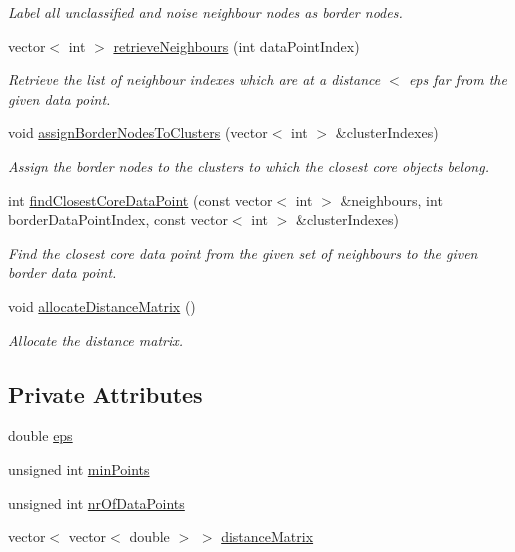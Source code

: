 \begin{DoxyCompactItemize}
\begin{DoxyCompactList}\small\item\em Label all unclassified and noise neighbour nodes as border nodes. \end{DoxyCompactList}\item 
vector$<$ int $>$ \hyperlink{classmultiscale_1_1analysis_1_1DBSCAN_a2524149cf55398e2038aaa389b56bfec}{retrieve\-Neighbours} (int data\-Point\-Index)
\begin{DoxyCompactList}\small\item\em Retrieve the list of neighbour indexes which are at a distance $<$ eps far from the given data point. \end{DoxyCompactList}\item 
void \hyperlink{classmultiscale_1_1analysis_1_1DBSCAN_a1c55a2e893f28de4a68129407c55d5f3}{assign\-Border\-Nodes\-To\-Clusters} (vector$<$ int $>$ \&cluster\-Indexes)
\begin{DoxyCompactList}\small\item\em Assign the border nodes to the clusters to which the closest core objects belong. \end{DoxyCompactList}\item 
int \hyperlink{classmultiscale_1_1analysis_1_1DBSCAN_a7a1c95e78edf9e804a7809648e130bda}{find\-Closest\-Core\-Data\-Point} (const vector$<$ int $>$ \&neighbours, int border\-Data\-Point\-Index, const vector$<$ int $>$ \&cluster\-Indexes)
\begin{DoxyCompactList}\small\item\em Find the closest core data point from the given set of neighbours to the given border data point. \end{DoxyCompactList}\item 
void \hyperlink{classmultiscale_1_1analysis_1_1DBSCAN_af50079a4d370fb35b13b0a1557a454f0}{allocate\-Distance\-Matrix} ()
\begin{DoxyCompactList}\small\item\em Allocate the distance matrix. \end{DoxyCompactList}\end{DoxyCompactItemize}
\subsection*{Private Attributes}
\begin{DoxyCompactItemize}
\item 
double \hyperlink{classmultiscale_1_1analysis_1_1DBSCAN_a8d68cd84561cbb06bd138f8edf340b9f}{eps}
\item 
unsigned int \hyperlink{classmultiscale_1_1analysis_1_1DBSCAN_a7bafd4070ac44e236fcc7f06d92b6572}{min\-Points}
\item 
unsigned int \hyperlink{classmultiscale_1_1analysis_1_1DBSCAN_af81a42ca24493494b3d20e27c76be016}{nr\-Of\-Data\-Points}
\item 
vector$<$ vector$<$ double $>$ $>$ \hyperlink{classmultiscale_1_1analysis_1_1DBSCAN_a863a8b90ff30d401795264a246a09147}{distance\-Matrix}
\end{DoxyCompactItemize}


